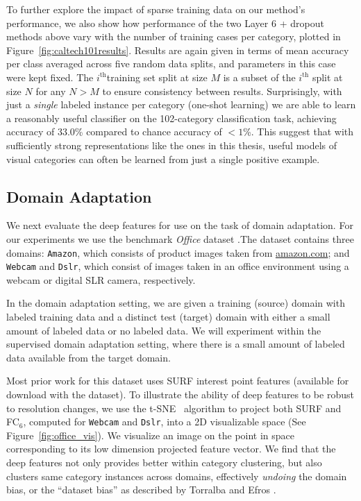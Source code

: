 To further explore the impact of sparse training data on our method's performance, we also show how performance of the two Layer 6 + dropout methods above vary with the number of training cases per category, plotted in Figure~\ref{fig:caltech101results}. Results are again given in terms of mean accuracy per class averaged across five random data splits, and parameters in this case were kept fixed. The $i^{\mathrm{th}}$training set split at size $M$ is a subset of the $i^{\mathrm{th}}$ split at size $N$ for any $N > M$ to ensure consistency between results. Surprisingly, with just a \textit{single} labeled instance per category (one-shot learning) we are able to learn a reasonably useful classifier on the 102-category classification task, achieving accuracy of 33.0\% compared to chance accuracy of $<1$\%. This suggest that with sufficiently strong representations like the ones in this thesis, useful models of visual categories can often be learned from just a single positive example.

\subsection{Domain Adaptation}
We next evaluate the deep features for use on the task of domain adaptation. For our experiments we use the benchmark \textit{Office} dataset \cite{saenko2010adapting}.The dataset contains three domains: \texttt{Amazon}, which consists of product images taken from \url{amazon.com}; and \texttt{Webcam} and \texttt{Dslr}, which consist of images taken in an office environment using a webcam or digital SLR camera, respectively. 

In the domain adaptation setting, we are given a training (source) domain with labeled training data and a distinct test (target) domain with either a small amount of labeled data or no labeled data. We will experiment within the supervised domain adaptation setting, where there is a small amount of labeled data available from the target domain. 

Most prior work for this dataset uses SURF \cite{surf06} interest point features (available for download with the dataset). To illustrate the ability of deep features to be robust to resolution changes, we use the t-SNE~\cite{tsne} algorithm to project both SURF and FC$_6$, computed for \texttt{Webcam} and \texttt{Dslr}, into a 2D visualizable space (See Figure~\ref{fig:office_vis}). We visualize an image on the point in space corresponding to its low dimension projected feature vector. We find that the deep features not only provides better within category clustering, but also clusters same category instances across domains, effectively \emph{undoing} the domain bias, or the ``dataset bias'' as described by Torralba and Efros \cite{torralba_cvpr11}.

